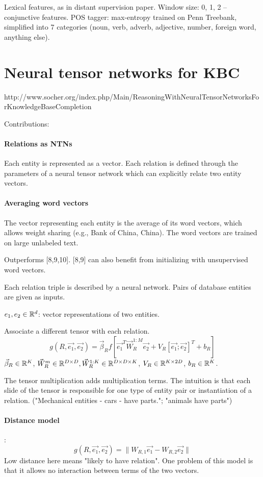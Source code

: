 Lexical features, as in distant supervision paper. Window size: 0, 1, 2 --
conjunctive features. POS tagger: max-entropy trained on Penn Treebank,
simplified into 7 categories (noun, verb, adverb, adjective, number, foreign
word, anything else).

\section{Neural tensor networks for KBC}
\label{neural-tensor-networks-for-kbc}

http://www.socher.org/index.php/Main/ReasoningWithNeuralTensorNetworksForKnowledgeBaseCompletion

Contributions:

\paragraph{Relations as NTNs}
Each entity is represented as a vector. Each relation is defined through the
parameters of a neural tensor network which can explicitly relate two entity
vectors.

\paragraph{Averaging word vectors}
The vector representing each entity is the average of its word vectors, which
allows weight sharing (e.g., Bank of China, China).
The word vectors are trained on large unlabeled text.

Outperforms [8,9,10]. [8,9] can also benefit from initializing with unsupervised
word vectors.

Each relation triple is described by a neural network. Pairs of database
entities are given as inputs.

$e_1, e_2\in\mathbb{R}^d$: vector representations of two entities.

Associate a different tensor with each relation.
$$g(R,\vec{e_1},\vec{e_2}) = \vec{\beta}_R f[\vec{e_1}^T \vec{W}_R^{1:M}
\vec{e_2} + V_R [\vec{e_1};\vec{e_2}]^T + b_R]$$
$\vec{\beta}_R\in\mathbb{R}^K$, $\vec{W}_R^m\in\mathbb{R}^{D\times D}, \vec{W}^{1:K}_R\in\mathbb{R}^{D\times
D\times K}$, $V_R\in\mathbb{R}^{K\times 2D}$, $b_R\in\mathbb{R}^K$.

The tensor multiplication adds multiplication terms.
The intuition is that each slide of the tensor is responsible for one type of
entity pair or instantiation of a relation. ("Mechanical entities - cars - have
parts."; "animals have parts")

\paragraph{Distance model}: $$g(R,\vec{e_1},\vec{e_2})=\|W_{R,1} \vec{e_1} -
W_{R,2} \vec{e_2}\|$$
Low distance here means "likely to have relation". One problem of this model
is that it allows no interaction between terms of the two vectors.

